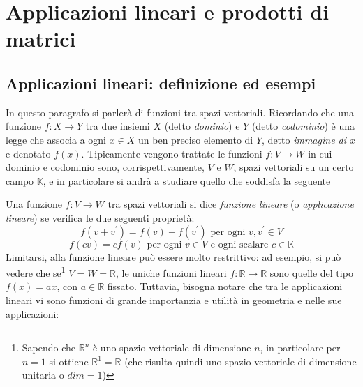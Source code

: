 
\chapter{Applicazioni lineari e prodotti di matrici}
\label{chap:appLinEprodotdimatrix}

\section{Applicazioni lineari: definizione ed esempi}
\label{sec:applindefes}

In questo paragrafo si parlerà di funzioni tra spazi vettoriali.
Ricordando che una funzione $f:X\to Y$ tra due insiemi $X$
(detto \textit{dominio}) e $Y$ (detto \textit{codominio}) è una legge che
associa a ogni $x\in X$ un ben preciso elemento di $Y$, detto
\textit{immagine di $x$} e denotato $f(x)$.
Tipicamente vengono trattate le funzioni $f:V\to W$ in cui dominio e
codominio sono, corrispettivamente, $V$ e $W$, spazi vettoriali su un
certo campo $\mathds{K}$, e in particolare si andrà a studiare quello che
soddisfa la seguente
\begin{defi}
  \label{defi:applindefes}
  Una funzione $f:V\to W$ tra spazi vettoriali si dice \textit{funzione
    lineare} (o \textit{applicazione lineare}) se verifica le due seguenti
  proprietà:
  \begin{equation}
    \label{eq:applindefes1}
    f(v+v^\prime)=f(v)+f(v^\prime) \text{ per ogni } v,v^\prime \in V 
  \end{equation}
  \begin{equation}
    \label{eq:applindefes2}
    f(cv)=cf(v) \text{ per ogni $v\in V$ e ogni scalare } c\in\mathds{K}
  \end{equation}
  Limitarsi, alla funzione lineare può essere molto restrittivo: ad
  esempio, si può vedere che se\footnote{Sapendo che $\mathds{R}^n$ è uno
    spazio vettoriale di dimensione $n$, in particolare per $n=1$ si
    ottiene $\mathds{R}^1=\mathds{R}$ (che risulta quindi uno spazio
    vettoriale di dimensione unitaria o $dim = 1$)} $V=W=\mathds{R}$, le
  uniche funzioni lineari $f:\mathds{R} \to \mathds{R}$ sono quelle del
  tipo $f(x)=ax$, con $a\in \mathds{R}$ fissato. Tuttavia, bisogna notare
  che tra le applicazioni lineari vi sono funzioni di grande importanzia
  e utilità in geometria e nelle sue applicazioni:
\end{defi}

